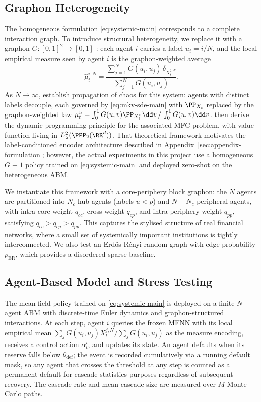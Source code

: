\documentclass[11pt]{article}
\begin{document}
\subsection{Graphon Heterogeneity}

The homogeneous formulation \eqref{eq:systemic-main} corresponds to a complete interaction graph. To introduce structural heterogeneity, we replace it with a graphon $G:[0,1]^2 \to [0,1]$ \citep{lovasz2012large}: each agent $i$ carries a label $u_i = i/N$, and the local empirical measure seen by agent $i$ is the graphon-weighted average
\begin{equation}\label{eq:local-measure}
  \hat\mu_t^{i,N} = \frac{\sum_{j=1}^N G(u_i,u_j)\,\delta_{X_t^{j,N}}}{\sum_{j=1}^N G(u_i,u_j)}.
\end{equation}
As $N\to\infty$, \citet{coppini2025graphon} establish propagation of chaos for this system: agents with distinct labels decouple, each governed by \eqref{eq:mkv-sde-main} with $\PP_{X_t}$ replaced by the graphon-weighted law $\mu_t^u = \int_0^1 G(u,v)\PP_{X_t^v}\dd v \,/\, \int_0^1 G(u,v)\dd v$. \citet{decrescenzo2025mfc} then derive the dynamic programming principle for the associated MFC problem, with value function living in $L^2_\lambda(\PPP_2(\RR^d))$. That theoretical framework motivates the label-conditioned encoder architecture described in Appendix~\ref{sec:appendix-formulation}; however, the actual experiments in this project use a homogeneous $G\equiv 1$ policy trained on \eqref{eq:systemic-main} and deployed zero-shot on the heterogeneous ABM.

We instantiate this framework with a core-periphery block graphon: the $N$ agents are partitioned into $N_c$ hub agents (labels $u < p$) and $N - N_c$ peripheral agents, with intra-core weight $q_{cc}$, cross weight $q_{cp}$, and intra-periphery weight $q_{pp}$, satisfying $q_{cc} > q_{cp} > q_{pp}$. This captures the stylised structure of real financial networks, where a small set of systemically important institutions is tightly interconnected. We also test an Erdős-Rényi random graph with edge probability $p_{\mathrm{ER}}$, which provides a disordered sparse baseline.

\subsection{Agent-Based Model and Stress Testing}

The mean-field policy trained on \eqref{eq:systemic-main} is deployed on a finite $N$-agent ABM with discrete-time Euler dynamics and graphon-structured interactions. At each step, agent $i$ queries the frozen MFNN with its local empirical mean $\sum_j G(u_i, u_j) X_t^{j,N} / \sum_j G(u_i, u_j)$ as the measure encoding, receives a control action $\alpha_t^i$, and updates its state. An agent defaults when its reserve falls below $\theta_{\mathrm{def}}$; the event is recorded cumulatively via a running default mask, so any agent that crosses the threshold at any step is counted as a permanent default for cascade-statistics purposes regardless of subsequent recovery. The cascade rate and mean cascade size are measured over $M$ Monte Carlo paths.
\end{document}
